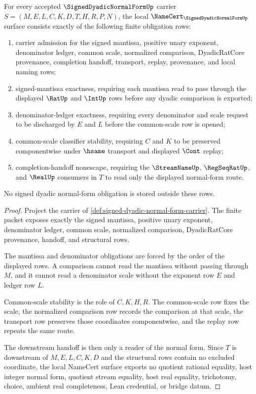 \begin{theorem}
\label{thm:signed-dyadic-normal-form-namecert-obligations}
For every accepted $\SignedDyadicNormalFormUp$ carrier $S=(M,E,L,C,K,D,T,H,R,P,N)$, the local $\NameCert_{\SignedDyadicNormalFormUp}$ surface consists exactly of the following finite obligation rows:
\begin{enumerate}
\item carrier admission for the signed mantissa, positive unary exponent, denominator ledger, common scale, normalized comparison, DyadicRatCore provenance, completion handoff, transport, replay, provenance, and local naming rows;
\item signed-mantissa exactness, requiring each mantissa read to pass through the displayed $\RatUp$ and $\IntUp$ rows before any dyadic comparison is exported;
\item denominator-ledger exactness, requiring every denominator and scale request to be discharged by $E$ and $L$ before the common-scale row is opened;
\item common-scale classifier stability, requiring $C$ and $K$ to be preserved componentwise under $\hsame$ transport and displayed $\Cont$ replay;
\item completion-handoff nonescape, requiring the $\StreamNameUp$, $\RegSeqRatUp$, and $\RealUp$ consumers in $T$ to read only the displayed normal-form route.
\end{enumerate}
No signed dyadic normal-form obligation is stored outside these rows.
\end{theorem}
\begin{proof}
Project the carrier of \autoref{def:signed-dyadic-normal-form-carrier}. The finite packet exposes exactly the signed mantissa, positive unary exponent, denominator ledger, common scale, normalized comparison, DyadicRatCore provenance, handoff, and structural rows.

The mantissa and denominator obligations are forced by the order of the displayed rows. A comparison cannot read the mantissa without passing through $M$, and it cannot read a denominator scale without the exponent row $E$ and ledger row $L$.

Common-scale stability is the role of $C,K,H,R$. The common-scale row fixes the scale, the normalized comparison row records the comparison at that scale, the transport row preserves those coordinates componentwise, and the replay row repeats the same route.

The downstream handoff is then only a reader of the normal form. Since $T$ is downstream of $M,E,L,C,K,D$ and the structural rows contain no excluded coordinate, the local NameCert surface exports no quotient rational equality, host integer normal form, quotient stream equality, host real equality, trichotomy, choice, ambient real completeness, Lean credential, or bridge datum.
\end{proof}

